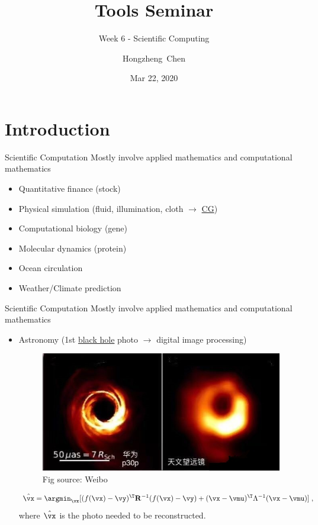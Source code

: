 \documentclass{../TexTemplate/myslide}
\title[ToolsSeminar]{Tools Seminar}
\subtitle{Week 6 - Scientific Computing}
\author[chhzh123]{Hongzheng~Chen}
\date[Mar 22, 2020]{Mar 22, 2020}
\begin{document}
\begin{frame}
\titlepage
\end{frame}

\begin{frame}
\tableofcontents
\end{frame}

\section{Introduction}
\begin{frame}
\sectionpage
\end{frame}

\begin{frame}{Scientific Computation}
Mostly involve applied mathematics and computational mathematics
\begin{itemize}
	\item Quantitative finance (stock)
	\item Physical simulation (fluid, illumination, cloth $\to$ \href{https://www.youtube.com/watch?v=EhDr3Rs5fTU}{CG})
	\item Computational biology (gene)
	\item Molecular dynamics (protein)
	\item Ocean circulation
	\item Weather/Climate prediction
\end{itemize}
\end{frame}

\begin{frame}{Scientific Computation}
Mostly involve applied mathematics and computational mathematics
\begin{itemize}
	\item Astronomy (1st \href{https://www.zhihu.com/question/318763133/answer/647517757}{black hole} photo $\to$ digital image processing)
	\begin{figure}[H]
	\centering
	\includegraphics[width=0.6\linewidth]{fig/blackhole.jpg}
	\caption*{\scriptsize Fig source: Weibo}
	\end{figure}
	\[\hat{\vx}=\argmin_{\vx}[(f(\vx)-\vy)^\T\mathbf{R}^{-1}(f(\vx)-\vy)+(\vx-\vmu)^\T\Lambda^{-1}(\vx-\vmu)]\;,\]
	where $\hat{\vx}$ is the photo needed to be reconstructed.
\end{itemize}
\end{frame}
\end{document}
